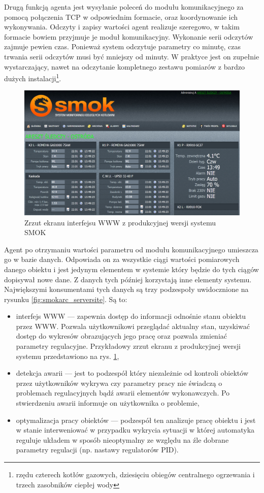\documentclass[a4paper,polish,12pt,twoside]{article}
\begin{document}
Drugą funkcją agenta jest wysyłanie poleceń do modułu komunikacyjnego za pomocą połączenia TCP w odpowiednim formacie, oraz koordynowanie ich wykonywania. Odczyty i zapisy wartości agent realizuje szeregowo, w takim formacie bowiem przyjmuje je moduł komunikacyjny. Wykonanie serii odczytów zajmuje pewien czas. Ponieważ system odczytuje parametry co minutę, czas trwania serii odczytów musi być mniejszy od minuty. W praktyce jest on zupełnie wystarczający, nawet na odczytanie kompletnego zestawu pomiarów z bardzo dużych instalacji\footnote{rzędu czterech kotłów gazowych, dziesięciu obiegów centralnego ogrzewania i trzech zasobników ciepłej wody}.

	\begin{figure}[h]
		\centering \includegraphics[width=15cm]{smokscreenshot}
		\caption{Zrzut ekranu interfejsu WWW z produkcyjnej wersji systemu SMOK}
		\label{fig:smokscreenshot}
	\end{figure}

Agent po otrzymaniu wartości parametru od modułu komunikacyjnego umieszcza go w bazie danych. Odpowiada on za wszystkie ciągi wartości pomiarowych danego obiektu i jest jedynym elementem w systemie który będzie do tych ciągów dopisywał nowe dane. Z danych tych później korzystają inne elementy systemu. Największymi konsumentami tych danych są trzy podzespoły uwidocznione na rysunku \ref{fig:smokarc_serversite}. Są to:
\begin{itemize}
	\item interfejs WWW --- zapewnia dostęp do informacji odnośnie stanu obiektu przez WWW. Pozwala użytkownikowi przeglądać aktualny stan, uzyskiwać dostęp do wykresów obrazujących jego pracę oraz pozwala zmieniać parametry regulacyjne. Przykładowy zrzut ekranu z produkcyjnej wersji systemu przedstawiono na rys. \ref{fig:smokscreenshot},
	\item detekcja awarii --- jest to podzespół który niezależnie od kontroli obiektów przez użytkowników wykrywa czy parametry pracy nie świadczą o problemach regulacyjnych bądź awarii elementów wykonawczych. Po stwierdzeniu awarii informuje on użytkownika o problemie,
	\item optymalizacja pracy obiektów --- podzespół ten analizuje pracę obiektu i jest w stanie interweniować w przypadku wykrycia sytuacji w której automatyka reguluje układem w sposób nieoptymalny ze względu na źle dobrane parametry regulacji (np. nastawy regulatorów PID).
\end{itemize}
\end{document}
